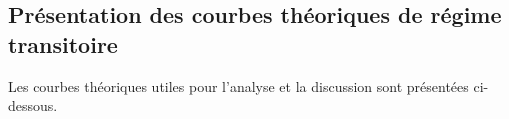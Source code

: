 \subsection{Présentation des courbes théoriques de régime transitoire}
Les courbes théoriques utiles pour l'analyse et la discussion sont présentées ci-dessous.

\begin{figure}[htb]
	\centering
\mbox{
		}

\end{figure}
